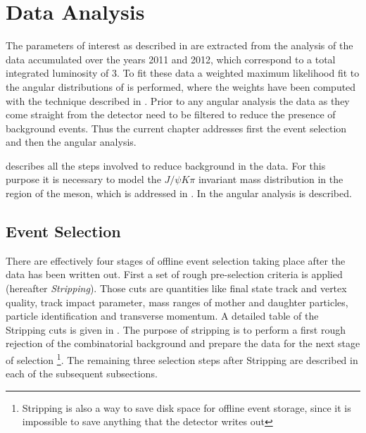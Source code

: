 \chapter{Data Analysis}
\label{Data_Analysis}

The parameters of interest as described in  are extracted from the analysis of the
\runone \lhcb data accumulated over the years 2011 and 2012, which correspond to a total integrated luminosity
of 3\invfb. To fit these data a weighted maximum likelihood fit to the angular distributions of \BsJpsiKst is performed,
where the weights have been computed with the \sPlot technique \cite{splot} described in .
Prior to any angular analysis the data as they come straight from the detector need to be filtered to reduce the presence of 
background events. Thus the current chapter addresses first the event selection and then the angular analysis.

 describes all the steps involved to reduce background in the data. For this purpose
it is necessary to model the $J/\psi K\pi$ invariant mass distribution in the region of the \Bs meson, which
is addressed in . In  the angular analysis is described.\\

\section{Event Selection}
\label{Event_Selection}

There are effectively four stages of offline event selection taking place after the data has been written out. 
First a set of rough pre-selection criteria is applied (hereafter {\it Stripping}). Those cuts are quantities like final state track and vertex quality,
track impact parameter, mass ranges of mother and daughter particles, particle identification and transverse momentum. A detailed 
table of the Stripping cuts is given in . The purpose of stripping is to perform a first rough rejection of the combinatorial
background and prepare the data for the next stage of selection \footnote{Stripping is also a way to save disk space for offline event storage, since it is impossible
to save anything that the detector writes out}. The remaining three selection steps after Stripping are described in each of the subsequent subsections.



